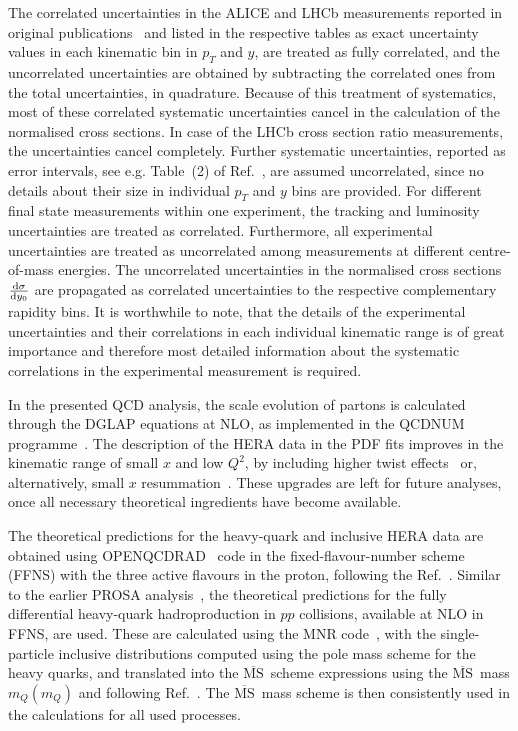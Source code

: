 \documentclass[12pt]{article}
\newcommand{\msbar}{$\overline{\text{MS}}\, $\xspace}
\begin{document}
The correlated uncertainties in the ALICE and LHCb measurements reported in original publications~\cite{Aaij:2016jht, Aaij:2013mga, Aaij:2015bpa, Acharya:2019mgn, Acharya:2017jgo, Aaij:2013noa} and listed in the respective tables as exact uncertainty values in each kinematic bin in $p_T$ and $y$, 
are treated as fully correlated, and the uncorrelated uncertainties are obtained by subtracting the correlated ones from the 
total uncertainties, in quadrature. Because of this treatment of systematics, most of these correlated systematic uncertainties cancel in the calculation of the normalised cross sections. In case of the LHCb cross section ratio measurements, the uncertainties cancel completely. Further systematic uncertainties, reported as error intervals, see e.g. Table~(2) of Ref.~\cite{Aaij:2016jht}, are assumed uncorrelated, since no details about their size in individual $p_T$ and $y$ bins are provided. 
For different final state measurements within one experiment, the tracking and luminosity uncertainties are treated as correlated. 
Furthermore, all experimental uncertainties are treated as uncorrelated among measurements at different centre-of-mass energies. 
The uncorrelated uncertainties in the normalised cross sections $\frac{{\rm d}\sigma}{{\rm d}y_0}$ are propagated as correlated uncertainties to the respective complementary rapidity bins.
It is worthwhile to note, that the details of the experimental uncertainties and their correlations in each individual kinematic range is of great importance and therefore most detailed information about the systematic correlations in the experimental measurement is required.

In the presented QCD analysis, the scale evolution of partons is calculated through the DGLAP equations at NLO, as implemented in 
the QCDNUM programme~\cite{openqcdrad}.  
The description of the HERA data in the PDF fits improves in the kinematic range of small $x$ and low $Q^2$, by including higher twist effects~\cite{Accardi:2016ndt,Alekhin:2017kpj}
or, alternatively, small $x$ resummation~\cite{Ball:2017otu,Abdolmaleki:2018jln}. 
These upgrades are left for future analyses, once all necessary theoretical ingredients have become available. 

The theoretical predictions for the heavy-quark and inclusive HERA data are obtained using OPENQCDRAD~\cite{openqcdrad} code in the 
fixed-flavour-number scheme (FFNS) with the three active flavours in the proton, following the Ref.~\cite{H1:2018flt}. 
Similar to the earlier PROSA analysis~\cite{Zenaiev:2015rfa}, the theoretical predictions for the fully differential 
heavy-quark hadroproduction in $pp$ collisions, available at NLO in FFNS, are used. These are calculated using 
the MNR code~\cite{Mangano:1991jk}, with the single-particle inclusive distributions computed using the pole mass scheme for the heavy quarks, 
and translated into the \msbar scheme expressions using the \msbar mass $m_Q(m_Q)$ and following Ref.~\cite{Dowling:2013baa}.
The \msbar mass scheme is then consistently used in the calculations for all used processes.
\end{document}

